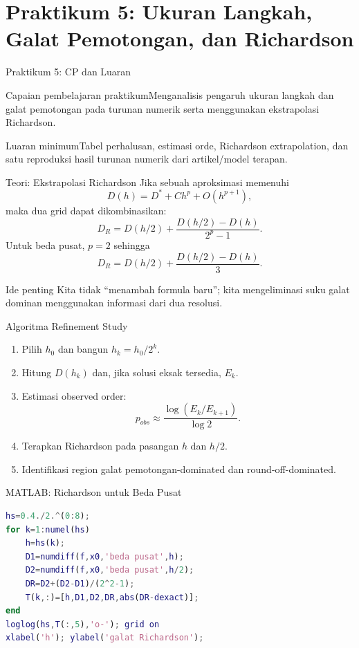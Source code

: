 \documentclass[slides,english,noindex,lean,nobackpage,nocopyright,noupdate,nosummary]{enacom}
\newcommand{\CPBox}[1]{\begin{block}{Capaian pembelajaran praktikum}#1\end{block}}
\newcommand{\OutBox}[1]{\begin{exampleblock}{Luaran minimum}#1\end{exampleblock}}
\begin{document}
\section{Praktikum 5: Ukuran Langkah, Galat Pemotongan, dan Richardson}

\begin{frame}{Praktikum 5: CP dan Luaran}
\CPBox{Menganalisis pengaruh ukuran langkah dan galat pemotongan pada turunan numerik serta menggunakan ekstrapolasi Richardson.}
\OutBox{Tabel perhalusan, estimasi orde, Richardson extrapolation, dan satu reproduksi hasil turunan numerik dari artikel/model terapan.}
\end{frame}

\begin{frame}{Teori: Ekstrapolasi Richardson}
Jika sebuah aproksimasi memenuhi
\[
D(h)=D^*+C h^p+O(h^{p+1}),
\]
maka dua grid dapat dikombinasikan:
\[
D_R= D(h/2)+\frac{D(h/2)-D(h)}{2^p-1}.
\]
Untuk beda pusat, $p=2$ sehingga
\[
D_R=D(h/2)+\frac{D(h/2)-D(h)}{3}.
\]
\begin{block}{Ide penting}
Kita tidak ``menambah formula baru''; kita mengeliminasi suku galat dominan menggunakan informasi dari dua resolusi.
\end{block}
\end{frame}

\begin{frame}{Algoritma Refinement Study}
\begin{enumerate}
\item Pilih $h_0$ dan bangun $h_k=h_0/2^k$.
\item Hitung $D(h_k)$ dan, jika solusi eksak tersedia, $E_k$.
\item Estimasi observed order:
\[
p_{obs}\approx\frac{\log(E_k/E_{k+1})}{\log 2}.
\]
\item Terapkan Richardson pada pasangan $h$ dan $h/2$.
\item Identifikasi region galat pemotongan-dominated dan round-off-dominated.
\end{enumerate}
\end{frame}

\begin{frame}{MATLAB: Richardson untuk Beda Pusat}
\begin{lstlisting}[language=Matlab]
hs=0.4./2.^(0:8);
for k=1:numel(hs)
    h=hs(k);
    D1=numdiff(f,x0,'beda pusat',h);
    D2=numdiff(f,x0,'beda pusat',h/2);
    DR=D2+(D2-D1)/(2^2-1);
    T(k,:)=[h,D1,D2,DR,abs(DR-dexact)];
end
loglog(hs,T(:,5),'o-'); grid on
xlabel('h'); ylabel('galat Richardson');
\end{lstlisting}
\end{frame}
\end{document}
